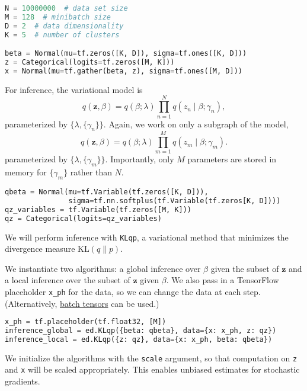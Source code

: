 \begin{lstlisting}[language=Python]
N = 10000000  # data set size
M = 128  # minibatch size
D = 2  # data dimensionality
K = 5  # number of clusters

beta = Normal(mu=tf.zeros([K, D]), sigma=tf.ones([K, D]))
z = Categorical(logits=tf.zeros([M, K]))
x = Normal(mu=tf.gather(beta, z), sigma=tf.ones([M, D]))
\end{lstlisting}

For inference, the variational model is
\begin{equation*}
q(\mathbf{z}, \beta) =
q(\beta; \lambda) \prod_{n=1}^N q(z_n \mid \beta; \gamma_n),
\end{equation*}
parameterized by $\{\lambda, \{\gamma_n\}\}$.
Again, we work on only a subgraph of the model,
\begin{equation*}
q(\mathbf{z}, \beta) =
q(\beta; \lambda) \prod_{m=1}^M q(z_m \mid \beta; \gamma_m).
\end{equation*}
parameterized by $\{\lambda, \{\gamma_m\}\}$. Importantly, only $M$
parameters are stored in memory for $\{\gamma_m\}$ rather than $N$.

\begin{lstlisting}[language=Python]
qbeta = Normal(mu=tf.Variable(tf.zeros([K, D])),
               sigma=tf.nn.softplus(tf.Variable(tf.zeros[K, D])))
qz_variables = tf.Variable(tf.zeros([M, K]))
qz = Categorical(logits=qz_variables)
\end{lstlisting}

We will perform inference with \texttt{KLqp}, a variational method
that minimizes the divergence measure $\text{KL}(q\| p)$.

We instantiate two algorithms: a global inference over $\beta$ given
the subset of $\mathbf{z}$ and a local inference over the subset of
$\mathbf{z}$ given $\beta$.
We also pass in a TensorFlow placeholder \texttt{x_ph} for the data,
so we can change the data at each step. (Alternatively,
\href{/api/data}{batch tensors} can be used.)

\begin{lstlisting}[language=Python]
x_ph = tf.placeholder(tf.float32, [M])
inference_global = ed.KLqp({beta: qbeta}, data={x: x_ph, z: qz})
inference_local = ed.KLqp({z: qz}, data={x: x_ph, beta: qbeta})
\end{lstlisting}

We initialize the algorithms with the \texttt{scale} argument, so that
computation on \texttt{z} and \texttt{x} will be scaled appropriately.
This enables unbiased estimates for stochastic gradients.

